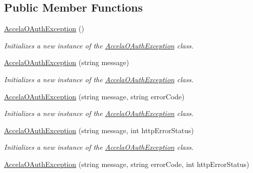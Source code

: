 \subsection*{Public Member Functions}
\begin{DoxyCompactItemize}
\item 
\hyperlink{class_accela_1_1_windows_store_s_d_k_1_1_accela_o_auth_exception_a95d31ae921d37d919435cac2005cd548}{Accela\+O\+Auth\+Exception} ()
\begin{DoxyCompactList}\small\item\em Initializes a new instance of the \hyperlink{class_accela_1_1_windows_store_s_d_k_1_1_accela_o_auth_exception}{Accela\+O\+Auth\+Exception} class. \end{DoxyCompactList}\item 
\hyperlink{class_accela_1_1_windows_store_s_d_k_1_1_accela_o_auth_exception_a29a533690705c4cb437db40c5954624a}{Accela\+O\+Auth\+Exception} (string message)
\begin{DoxyCompactList}\small\item\em Initializes a new instance of the \hyperlink{class_accela_1_1_windows_store_s_d_k_1_1_accela_o_auth_exception}{Accela\+O\+Auth\+Exception} class. \end{DoxyCompactList}\item 
\hyperlink{class_accela_1_1_windows_store_s_d_k_1_1_accela_o_auth_exception_a6e4f22f785ac88bc072170f7d456815f}{Accela\+O\+Auth\+Exception} (string message, string error\+Code)
\begin{DoxyCompactList}\small\item\em Initializes a new instance of the \hyperlink{class_accela_1_1_windows_store_s_d_k_1_1_accela_o_auth_exception}{Accela\+O\+Auth\+Exception} class. \end{DoxyCompactList}\item 
\hyperlink{class_accela_1_1_windows_store_s_d_k_1_1_accela_o_auth_exception_a651a49f04a88c545d983dc38b4fbe2e4}{Accela\+O\+Auth\+Exception} (string message, int http\+Error\+Status)
\begin{DoxyCompactList}\small\item\em Initializes a new instance of the \hyperlink{class_accela_1_1_windows_store_s_d_k_1_1_accela_o_auth_exception}{Accela\+O\+Auth\+Exception} class. \end{DoxyCompactList}\item 
\hyperlink{class_accela_1_1_windows_store_s_d_k_1_1_accela_o_auth_exception_a67f763e965b662d3150246e0019a54e8}{Accela\+O\+Auth\+Exception} (string message, string error\+Code, int http\+Error\+Status)

\end{DoxyCompactItemize}
